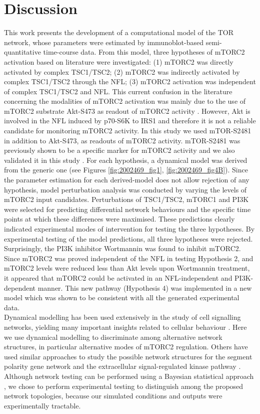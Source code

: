 \section{Discussion}
\label{paper1-sec:Discussion}
This work presents the development of a computational model of the TOR network, whose parameters were estimated by immunoblot-based semi-quantitative time-course data. From this model, three hypotheses of mTORC2 activation based on literature were investigated: (1) mTORC2 was directly activated by complex TSC1/TSC2; (2) mTORC2 was indirectly activated by complex TSC1/TSC2 through the NFL; (3) mTORC2 activation was independent of complex TSC1/TSC2 and NFL. This current confusion in the literature concerning the modalities of mTORC2 activation was mainly due to the use of mTORC2 substrate Akt-S473 as readout of mTORC2 activity \citep{Huang2008, Huang2009signaling, Yang2006tsc1}. However, Akt is involved in the NFL induced by p70-S6K to IRS1 and therefore it is not a reliable candidate for monitoring mTORC2 activity. In this study we used mTOR-S2481 in addition to Akt-S473, as readouts of mTORC2 activity. mTOR-S2481 was previously shown to be a specific marker for mTORC2 activity \citep{Copp2009} and we also 
validated it in this study \citep{DallePezze2012a, DallePezze2012b}. For each hypothesis, a dynamical model was derived from the generic one (see Figures \ref{fig:2002469_fig1}, \ref{fig:2002469_fig4B}). Since the parameter estimation for each derived-model does not allow rejection of any hypothesis, model perturbation analysis was conducted by varying the levels of mTORC2 input candidates. Perturbations of TSC1/TSC2, mTORC1 and PI3K were selected for predicting differential network behaviours and the specific time points at which these differences were maximised. These predictions clearly indicated experimental modes of intervention for testing the three hypotheses. By experimental testing of the model predictions, all three hypotheses were rejected. Surprisingly, the PI3K inhibitor Wortmannin was found to inhibit mTORC2. Since mTORC2 was proved independent of the NFL in testing Hypothesis 2, and mTORC2 levels were reduced less than Akt levels upon Wortmannin treatment, it appeared that mTORC2 could be activated in an NFL-independent and PI3K-dependent manner. This new pathway (Hypothesis 4) was implemented in a new model which was shown to be consistent with all the generated experimental data. \\
Dynamical modelling has been used extensively in the study of cell signalling networks, yielding many important insights related to cellular behaviour \citep{Kholodenko2006}. Here we use dynamical modelling to discriminate among alternative network structures, in particular alternative modes of mTORC2 regulation. Others have used similar approaches to study the possible network structures for the segment polarity gene network \citep{vonDassow2000} and the extracellular signal-regulated kinase pathway \citep{Xu2010}. Although network testing can be performed using a Bayesian statistical approach \citep{Xu2010}, we chose to perform experimental testing to distinguish among the proposed network topologies, because our simulated conditions and outputs were experimentally tractable.\\
